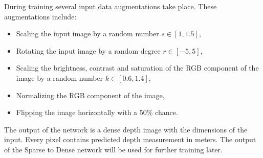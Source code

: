 \documentclass[twoside]{ctuthesis}
\theoremstyle{plain}
\theoremstyle{definition}
\theoremstyle{note}
\begin{document}
During training several input data augmentations take place. These augmentations include:
\begin{itemize}
	\item Scaling the input image by a random number $s\in[1,1.5]$,
	\item Rotating the input image by a random degree $r\in[-5,5]$,
	\item Scaling the brightness, contrast and saturation of the RGB component of the image by a random number $k\in[0.6,1.4]$,
	\item Normalizing the RGB component of the image,
	\item Flipping the image horizontally with a 50\% chance.
\end{itemize}
The output of the network is a dense depth image with the dimensions of the input. Every pixel contains predicted depth measurement in meters. The output of the Sparse to Dense network will be used for further training later.
\end{document}
